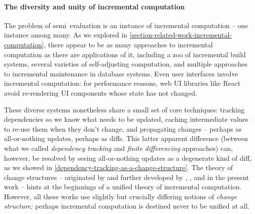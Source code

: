 \paragraph{The diversity and unity of incremental computation}

The problem of semi\naive\ evaluation is an instance of incremental computation
-- one instance among many.
%
As we explored in \cref{section-related-work-incremental-computation}, there
appear to be as many approaches to incremental computation as there are
applications of it, including a zoo of incremental build systems, several
varieties of self-adjusting computation, and multiple approaches to incremental
maintenance in database systems.
%
Even user interfaces involve incremental computation: for performance reasons,
web UI libraries like React avoid re-rendering UI components whose state has not
changed.\footnotemark\


These diverse systems nonetheless share a small set of core techniques: tracking
dependencies so we know what needs to be updated, caching intermediate values to
re-use them when they don't change, and propagating changes -- perhaps as
all-or-nothing updates, perhaps as diffs. This latter apparent difference
(between what we called \emph{dependency tracking} and \emph{finite
differencing} approaches) can, however, be resolved by seeing all-or-nothing
updates as a degenerate kind of diff, as we showed in
\cref{dependency-tracking-as-a-change-structure}. The theory of change
structures -- originated by \citet{incremental} and further developed by
\cite{DBLP:phd/dnb/Giarrusso20}, \cite{mario-thesis}, and in the present work --
hints at the beginnings of a unified theory of incremental computation. However,
all these works use slightly but crucially differing notions of \emph{change
structure;} perhaps incremental computation is destined never to be unified at
all.


